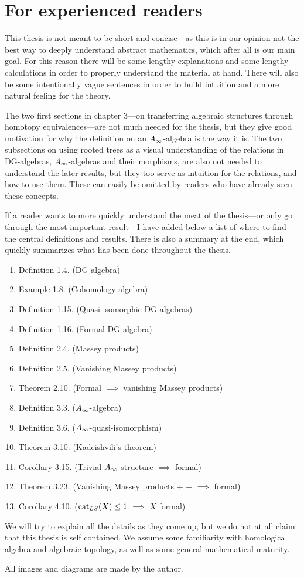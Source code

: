 

\section{For experienced readers}

This thesis is not meant to be short and concise---as this is in our opinion not the best way to deeply understand abstract mathematics, which after all is our main goal. For this reason there will be some lengthy explanations and some lengthy calculations in order to properly understand the material at hand. There will also be some intentionally vague sentences in order to build intuition and a more natural feeling for the theory. 

The two first sections in chapter 3---on transferring algebraic structures through homotopy equivalences---are not much needed for the thesis, but they give good motivation for why the definition on an $A_{\infty}$-algebra is the way it is. The two subsections on using rooted trees as a visual understanding of the relations in DG-algebras, $A_{\infty}$-algebras and their morphisms, are also not needed to understand the later results, but they too serve as intuition for the relations, and how to use them. These can easily be omitted by readers who have already seen these concepts. 

If a reader wants to more quickly understand the meat of the thesis---or only go through the most important result---I have added below a list of where to find the central definitions and results. There is also a summary at the end, which quickly summarizes what has been done throughout the thesis. 

\begin{enumerate}
	\item Definition 1.4. (DG-algebra)
	\item Example 1.8. (Cohomology algebra)
	\item Definition 1.15. (Quasi-isomorphic DG-algebras)
	\item Definition 1.16. (Formal DG-algebra)
	\item Definition 2.4. (Massey products)
	\item Definition 2.5. (Vanishing Massey products)
	\item Theorem 2.10. (Formal $\implies$ vanishing Massey products)
	\item Definition 3.3. ($A_{\infty}$-algebra)
	\item Definition 3.6. ($A_{\infty}$-quasi-isomorphism)
	\item Theorem 3.10. (Kadeishvili's theorem)
	\item Corollary 3.15. (Trivial $A_{\infty}$-structure $\implies$ formal)
	\item Theorem 3.23. (Vanishing Massey products + + $\implies$ formal)
	\item Corollary 4.10. ($\text{cat}_{LS}(X)\leq 1$ $\implies$ $X$ formal)
\end{enumerate}

We will try to explain all the details as they come up, but we do not at all claim that this thesis is self contained. We assume some familiarity with homological algebra and algebraic topology, as well as some general mathematical maturity. 

All images and diagrams are made by the author. 